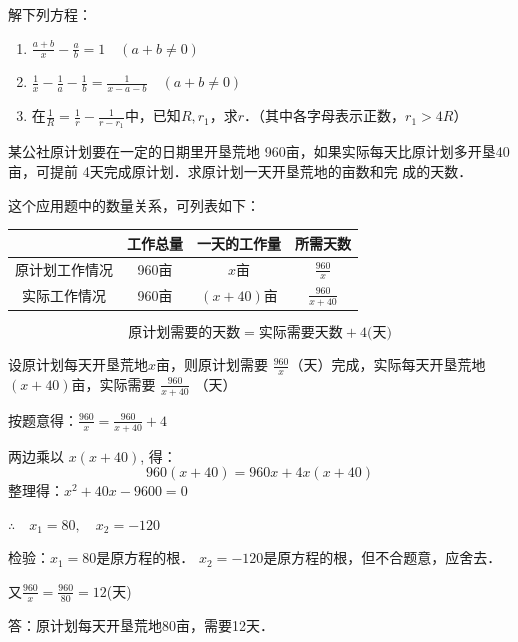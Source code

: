\begin{ex}
    解下列方程：
\begin{enumerate}
    \item $\frac{a+b}{x}-\frac{a}{b}=1\quad (a+b\ne 0)$
    \item $\frac{1}{x}-\frac{1}{a}-\frac{1}{b}=\frac{1}{x-a-b}\quad (a+b\ne 0)$
    \item 在$\frac{1}{R}=\frac{1}{r}-\frac{1}{r-r_1}$中，已知$R,r_1$，求$r$．（其中各字母表示正数，$r_1>4R$）
\end{enumerate}
\end{ex}

\begin{example}
    某公社原计划要在一定的日期里开垦荒地
960亩，如果实际每天比原计划多开垦40亩，可提前
4天完成原计划．求原计划一天开垦荒地的亩数和完
成的天数．
\end{example}

\begin{analyze}
    这个应用题中的数量关系，可列表如下：
\begin{center}
    \begin{tabular}{cccc}
        \hline
    &    工作总量&一天的工作量&所需天数\\
    \hline
原计划工作情况&960亩& $x$亩  & $\tfrac{960}{x}$\\
实际工作情况&960亩&$(x+40)$亩 & $\tfrac{960}{x+40}$\\
\hline
    \end{tabular}
\end{center}
\[\text{原计划需要的天数}=\text{实际需要天数}+4\text{(天)}\]
\end{analyze}


\begin{solution}
    设原计划每天开垦荒地$x$亩，则原计划需要
    $\frac{960}{x}$（天）完成，实际每天开垦荒地$(x+40)$亩，实际需要
   $\frac{960}{x+40}$
    （天）
    
    按题意得：$\frac{960}{x}=\frac{960}{x+40}+4$
    
    两边乘以
    $x(x+40)$, 得：
    \[960(x+40)=960x+4x(x+40)\]
    整理得：$x^2+40x-9600=0$

    $\therefore\quad x_1=80,\quad x_2=-120$
    
    检验：$x_1=80$是原方程的根．    $x_2=-120$是原方程的根，但不合题意，应舍去．

    又$\frac{960}{x}=\frac{960}{80}=12$(天)

    答：原计划每天开垦荒地80亩，需要12天．
\end{solution}



